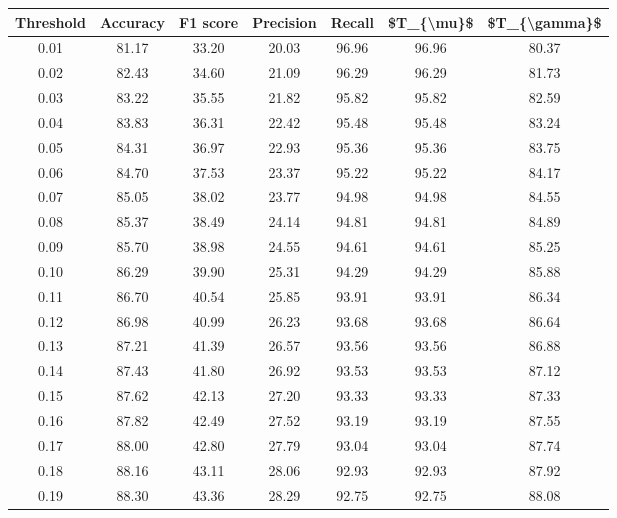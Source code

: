 \begin{tabular}{|c|c|c|c|c|c|c|}
\hline
 Threshold &  Accuracy &  F1 score &  Precision &  Recall &  \$T\_\{\textbackslash mu\}\$ &  \$T\_\{\textbackslash gamma\}\$ \\
\hline
      0.01 &     81.17 &     33.20 &      20.03 &   96.96 &      96.96 &         80.37 \\
      0.02 &     82.43 &     34.60 &      21.09 &   96.29 &      96.29 &         81.73 \\
      0.03 &     83.22 &     35.55 &      21.82 &   95.82 &      95.82 &         82.59 \\
      0.04 &     83.83 &     36.31 &      22.42 &   95.48 &      95.48 &         83.24 \\
      0.05 &     84.31 &     36.97 &      22.93 &   95.36 &      95.36 &         83.75 \\
      0.06 &     84.70 &     37.53 &      23.37 &   95.22 &      95.22 &         84.17 \\
      0.07 &     85.05 &     38.02 &      23.77 &   94.98 &      94.98 &         84.55 \\
      0.08 &     85.37 &     38.49 &      24.14 &   94.81 &      94.81 &         84.89 \\
      0.09 &     85.70 &     38.98 &      24.55 &   94.61 &      94.61 &         85.25 \\
      0.10 &     86.29 &     39.90 &      25.31 &   94.29 &      94.29 &         85.88 \\
      0.11 &     86.70 &     40.54 &      25.85 &   93.91 &      93.91 &         86.34 \\
      0.12 &     86.98 &     40.99 &      26.23 &   93.68 &      93.68 &         86.64 \\
      0.13 &     87.21 &     41.39 &      26.57 &   93.56 &      93.56 &         86.88 \\
      0.14 &     87.43 &     41.80 &      26.92 &   93.53 &      93.53 &         87.12 \\
      0.15 &     87.62 &     42.13 &      27.20 &   93.33 &      93.33 &         87.33 \\
      0.16 &     87.82 &     42.49 &      27.52 &   93.19 &      93.19 &         87.55 \\
      0.17 &     88.00 &     42.80 &      27.79 &   93.04 &      93.04 &         87.74 \\
      0.18 &     88.16 &     43.11 &      28.06 &   92.93 &      92.93 &         87.92 \\
      0.19 &     88.30 &     43.36 &      28.29 &   92.75 &      92.75 &         88.08 \\

\end{tabular}
